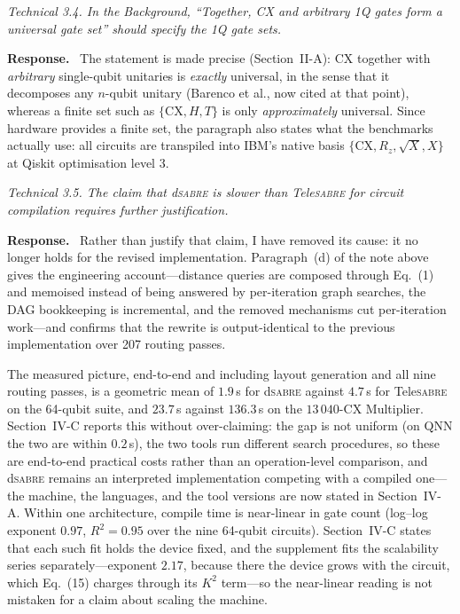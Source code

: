 \documentclass[11pt]{article}
\newcommand{\dSABRE}{d\textsc{sabre}}
\newcommand{\TeleSABRE}{Tele\textsc{sabre}}
\newenvironment{comment}{\medskip\noindent\itshape}{\par}
\newcommand{\response}{\smallskip\noindent\textbf{Response.}\ }
\begin{document}
\begin{comment}
Technical 3.4. In the Background, ``Together, CX and arbitrary 1Q gates form a
universal gate set'' should specify the 1Q gate sets.
\end{comment}

\response
The statement is made precise (Section~II-A): CX together with \emph{arbitrary}
single-qubit unitaries is \emph{exactly} universal, in the sense that it
decomposes any $n$-qubit unitary (Barenco et al., now cited at that point),
whereas a finite set such as $\{\mathrm{CX},H,T\}$ is only
\emph{approximately} universal. Since hardware provides a finite set, the
paragraph also states what the benchmarks actually use: all circuits are
transpiled into IBM's native basis $\{\mathrm{CX},R_z,\sqrt{X},X\}$ at Qiskit
optimisation level 3.

\begin{comment}
Technical 3.5. The claim that \dSABRE{} is slower than \TeleSABRE{} for
circuit compilation requires further justification.
\end{comment}

\response
Rather than justify that claim, I have removed its cause: it no longer holds
for the revised implementation. Paragraph~(d) of the note above gives the
engineering account---distance queries are composed through Eq.~(1) and
memoised instead of being answered by per-iteration graph searches, the DAG
bookkeeping is incremental, and the removed mechanisms cut per-iteration
work---and confirms that the rewrite is output-identical to the previous
implementation over 207 routing passes.

The measured picture, end-to-end and including layout generation and all nine
routing passes, is a geometric mean of $1.9$\,s for \dSABRE{} against $4.7$\,s
for \TeleSABRE{} on the 64-qubit suite, and $23.7$\,s against $136.3$\,s on
the $13\,040$-CX Multiplier. Section~IV-C reports this without
over-claiming: the gap is not uniform (on QNN the two are within $0.2$\,s),
the two tools run different search procedures, so these are end-to-end
practical costs rather than an operation-level comparison, and \dSABRE{}
remains an interpreted implementation competing with a compiled one---the
machine, the languages, and the tool versions are now stated in Section~IV-A.
Within one architecture, compile time is near-linear in gate count (log--log
exponent $0.97$, $R^2=0.95$ over the nine 64-qubit circuits). Section~IV-C
states that each such fit holds the device fixed, and the supplement fits the
scalability series separately---exponent $2.17$, because there the device grows
with the circuit, which Eq.~(15) charges through its $K^2$ term---so the
near-linear reading is not mistaken for a claim about scaling the machine.
\end{document}
